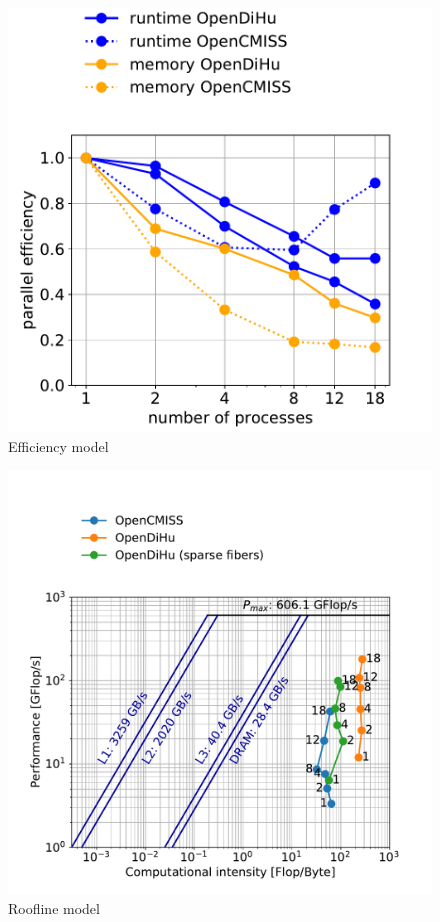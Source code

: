 \begin{figure}[H]
  \centering%
  \includegraphics[width=\textwidth]{images/results/studies/0_weak_scaling_efficiency.pdf}%
  \caption{Efficiency model}%
  \label{fig:roofline}%
\end{figure}%

\begin{figure}[H]
  \centering%
  \includegraphics[width=\textwidth]{images/results/studies/0_roofline.pdf}%
  \caption{Roofline model}%
  \label{fig:roofline}%
\end{figure}%

